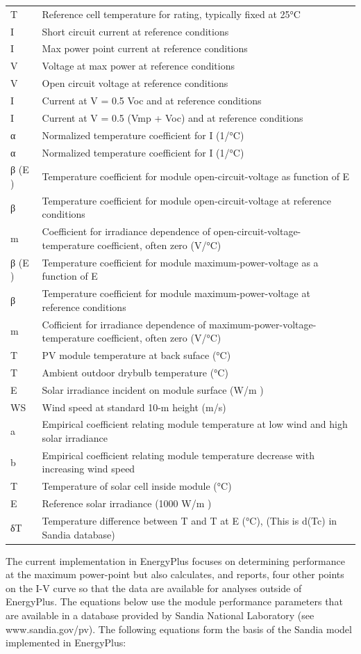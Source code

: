 \begin{longtable}[c]{p{1.5in}p{4.5in}}
T & Reference cell temperature for rating, typically fixed at 25°C \tabularnewline
I & Short circuit current at reference conditions \tabularnewline
I & Max power point current at reference conditions \tabularnewline
V & Voltage at max power at reference conditions \tabularnewline
V & Open circuit voltage at reference conditions \tabularnewline
I & Current at V = 0.5 Voc and at reference conditions \tabularnewline
I & Current at V = 0.5 (Vmp + Voc) and at reference conditions \tabularnewline
α & Normalized temperature coefficient for I   (1/°C) \tabularnewline
α & Normalized temperature coefficient for I   (1/°C) \tabularnewline
β  (E  ) & Temperature coefficient for module open-circuit-voltage as function of E \tabularnewline
β & Temperature coefficient for module open-circuit-voltage at reference conditions \tabularnewline
m & Coefficient for irradiance dependence of open-circuit-voltage-temperature coefficient, often zero (V/°C) \tabularnewline
β  (E  ) & Temperature coefficient for module maximum-power-voltage as a function of E \tabularnewline
β & Temperature coefficient for module maximum-power-voltage at reference conditions \tabularnewline
m & Cofficient for irradiance dependence of maximum-power-voltage-temperature coefficient, often zero (V/°C) \tabularnewline
T & PV module temperature at back suface (°C) \tabularnewline
T & Ambient outdoor drybulb temperature (°C) \tabularnewline
E & Solar irradiance incident on module surface (W/m  ) \tabularnewline
WS & Wind speed at standard 10-m height (m/s) \tabularnewline
a & Empirical coefficient relating module temperature at low wind and high solar irradiance \tabularnewline
b & Empirical coefficient relating module temperature decrease with increasing wind speed \tabularnewline
T & Temperature of solar cell inside module (°C) \tabularnewline
E & Reference solar irradiance (1000 W/m  ) \tabularnewline
δT & Temperature difference between T   and T  at E  (°C), (This is d(Tc) in Sandia database) \tabularnewline
\bottomrule
\end{longtable}

The current implementation in EnergyPlus focuses on determining performance at the maximum power-point but also calculates, and reports, four other points on the I-V curve so that the data are available for analyses outside of EnergyPlus. The equations below use the module performance parameters that are available in a database provided by Sandia National Laboratory (see www.sandia.gov/pv). The following equations form the basis of the Sandia model implemented in EnergyPlus:

